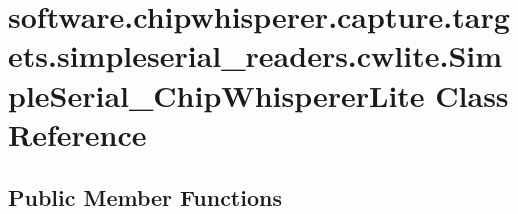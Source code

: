 \hypertarget{classsoftware_1_1chipwhisperer_1_1capture_1_1targets_1_1simpleserial__readers_1_1cwlite_1_1SimpleSerial__ChipWhispererLite}{}\section{software.\+chipwhisperer.\+capture.\+targets.\+simpleserial\+\_\+readers.\+cwlite.\+Simple\+Serial\+\_\+\+Chip\+Whisperer\+Lite Class Reference}
\label{classsoftware_1_1chipwhisperer_1_1capture_1_1targets_1_1simpleserial__readers_1_1cwlite_1_1SimpleSerial__ChipWhispererLite}
\subsection*{Public Member Functions}
